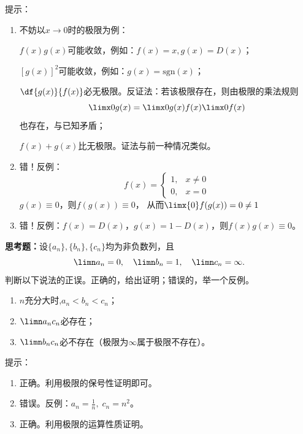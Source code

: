 \ifhint
提示：
\begin{enumerate}[(1)]
  \setlength{\itemindent}{1cm}
	\item 不妨以$x\to0$时的极限为例：

	\quad$f(x)g(x)$可能收敛，例如：$f(x)=x,g(x)=D(x)$；

	\quad$[g(x)]^2$可能收敛，例如：$g(x)=\mathrm{sgn}(x)$；

	\quad$\df{g(x)}{f(x)}$必无极限。反证法：若该极限存在，则由极限的乘法规则
	$$\limx0g(x)=\limx0{g(x)}{f(x)}\limx0f(x)$$
	也存在，与已知矛盾；

	\quad$f(x)+g(x)$比无极限。证法与前一种情况类似。
	\item 错！反例：
	$$f(x)=\left\{\begin{array}{ll}
	  1,&x\ne0\\0,&x=0
	\end{array}\right.$$
	\quad$g(x)\equiv 0$，则$f(g(x))\equiv0$，
	从而$\limx{0}f(g(x))=0\ne 1$
	\item 错！反例：$f(x)=D(x)$，$g(x)=1-D(x)$，则$f(x)g(x)\equiv 0$。
	\fin
\end{enumerate}
\fi

{\bf 思考题：}设$\{a_n\},\{b_n\},\{c_n\}$均为非负数列，且
  $$\limn a_n=0,\quad \limn b_n=1,\quad \limn c_n=\infty.$$
  判断以下说法的正误。正确的，给出证明；错误的，举一个反例。
  \begin{enumerate}[(1)]
  	\setlength{\itemindent}{1cm}
    \item $n$充分大时,$a_n<b_n<c_n$；
    \item $\limn a_nc_n$必存在；
    \item $\limn b_nc_n$必不存在（极限为$\infty$属于极限不存在）。
  \end{enumerate}

\ifhint
提示：
\begin{enumerate}[(1)]
	\setlength{\itemindent}{1cm}
	\item 正确。利用极限的保号性证明即可。
	\item 错误。反例：$a_n=\frac1n,\;c_n=n^2$。
	\item 正确。利用极限的运算性质证明。
\end{enumerate}
\fi

